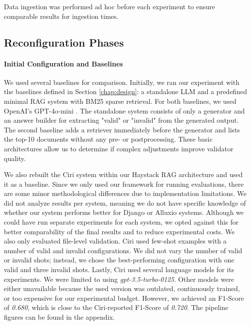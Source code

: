Data ingestion was performed ad hoc before each experiment to ensure comparable results for ingestion times.

\subsection{Reconfiguration Phases} \label{sec:exp_results} 

\paragraph{Initial Configuration and Baselines} \label{sec:exp_initial_config}
We used several baselines for comparison. Initially, we ran our experiment with the baselines defined in Section \ref{chap:design}: a standalone LLM and a predefined minimal RAG system with BM25 sparse retrieval. For both baselines, we used OpenAI's GPT-4o-mini \cite{OpenAI_2022}. The standalone system consists of only a generator and an answer builder for extracting "valid" or "invalid" from the generated output. The second baseline adds a retriever immediately before the generator and lists the top-10 documents without any pre- or postprocessing. These basic architectures allow us to determine if complex adjustments improve validator quality.

We also rebuilt the Ciri system within our Haystack RAG architecture and used it as a baseline. Since we only used our framework for running evaluations, there are some minor methodological differences due to implementation limitations. We did not analyze results per system, meaning we do not have specific knowledge of whether our system performs better for Django or Alluxio systems. Although we could have run separate experiments for each system, we opted against this for better comparability of the final results and to reduce experimental costs. We also only evaluated file-level validation. Ciri used few-shot examples with a number of valid and invalid configurations. We did not vary the number of valid or invalid shots; instead, we chose the best-performing configuration with one valid and three invalid shots. Lastly, Ciri used several language models for its experiments. We were limited to using \textit{gpt-3.5-turbo-0125}\cite{OpenAI_2022}. Other models were either unavailable because the used version was outdated, continuously trained, or too expensive for our experimental budget. However, we achieved an F1-Score of \textit{0.680}, which is close to the Ciri-reported F1-Score of \textit{0.720}. The pipeline figures can be found in the appendix.

